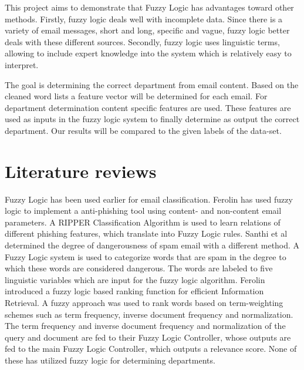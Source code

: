 \documentclass[journal]{IEEEtran}
\begin{document}
This project aims to demonstrate that Fuzzy Logic has advantages toward other methods. Firstly, fuzzy logic deals well with incomplete data. Since there is a variety of email messages, short and long, specific and vague, fuzzy logic better deals with these different sources. Secondly, fuzzy logic uses linguistic terms, allowing to include expert knowledge into the system which is relatively easy to interpret.


The goal is determining the correct department from email content. Based on the cleaned word lists a feature vector will be determined for each email. For department determination content specific features are used. These features are used as inputs in the fuzzy logic system to finally determine as output the correct department. Our results will be compared to the given labels of the data-set.\\

\section{Literature reviews}

Fuzzy Logic has been used earlier for email classification. Ferolin \cite{phishing}
has used fuzzy logic to implement a anti-phishing tool using content- and non-content email parameters. A RIPPER Classification Algorithm is used to learn relations of different phishing features, which translate into Fuzzy Logic rules. Santhi et al \cite{spam} determined the degree of dangerousness of spam email with a different method. A Fuzzy Logic system is used to categorize words that are spam in the degree to which these words are considered dangerous. The words are labeled to five linguistic variables which are input for the fuzzy logic algorithm. Ferolin \cite{ranking} introduced a fuzzy logic based ranking function for efficient Information Retrieval. A fuzzy approach was used to rank words based on term-weighting schemes such as term frequency, inverse document frequency and normalization. The term frequency and inverse document frequency and normalization of the query and document are fed to their Fuzzy Logic Controller, whose outputs are fed to the main Fuzzy Logic Controller, which outputs a relevance score. None of these has utilized fuzzy logic for determining departments.
\end{document}

